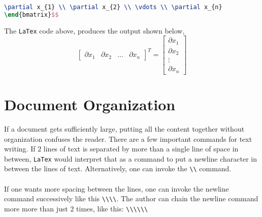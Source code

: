 \documentclass[a4paper, 12pt]{report}
\begin{document}
\begin{center}
\begin{lstlisting}[language=tex]
\partial x_{1} \\ \partial x_{2} \\ \vdots \\ \partial x_{n}
\end{bmatrix}$$
\end{lstlisting}
The \texttt{LaTex} code above, produces the output shown below,
$$\begin{bmatrix}
\partial x_{1} & \partial x_{2} & \dots & \partial x_{n}
\end{bmatrix}^{T} = \begin{bmatrix}
\partial x_{1} \\ \partial x_{2} \\ \vdots \\ \partial x_{n}
\end{bmatrix}$$

\section{Document Organization}
\begin{comment}
\begin{lstlisting}[language=tex]
\end{lstlisting}
The \texttt{LaTex} code above, produces the output shown below,
\end{comment}
If a document gets sufficiently large, putting all the content together without organization confuses the reader. There are a few important commands for text writing. If $2$ lines of text is separated by more than a single line of space in between, \texttt{LaTex} would interpret that as a command to put a newline character in between the lines of text. Alternatively, one can invoke the \texttt{\textbackslash \textbackslash} command.
\\~\\If one wants more spacing between the lines, one can invoke the newline command successively like this \texttt{\textbackslash \textbackslash \texttildelow \textbackslash \textbackslash}. The author can chain the newline command more more than just $2$ times, like this: \texttt{\textbackslash \textbackslash \texttildelow \textbackslash \textbackslash \texttildelow \textbackslash \textbackslash } 


\end{center}
\end{document}
